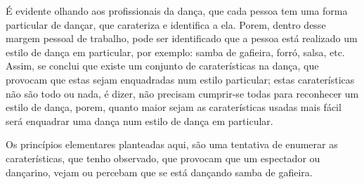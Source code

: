 É evidente olhando aos profissionais da dança,
que cada pessoa tem uma forma particular de dançar, 
que carateriza e identifica a ela. Porem, 
dentro desse margem pessoal de trabalho, 
pode ser identificado que a pessoa está realizado um estilo de dança em particular,
por exemplo: samba de gafieira, forró, salsa, etc.
Assim, se conclui que existe um conjunto de caraterísticas na dança,
que provocam que estas sejam enquadradas num estilo particular;
estas caraterísticas não são todo ou nada, é dizer, 
não precisam cumprir-se todas para reconhecer um estilo de dança,
porem, quanto maior sejam as caraterísticas usadas mais fácil será enquadrar uma dança num estilo de dança em particular.

Os princípios elementares planteadas aqui, são uma tentativa de enumerar as caraterísticas,
que tenho observado, que provocam que um espectador ou dançarino,
vejam ou percebam que se está dançando samba de gafieira.
